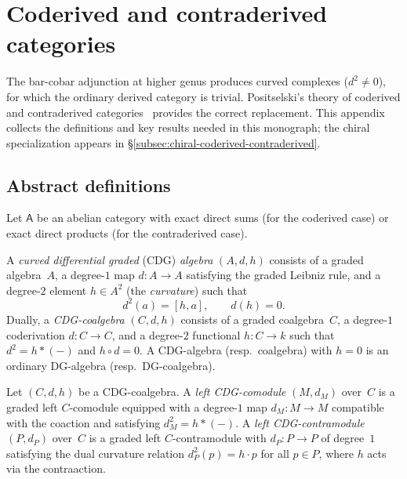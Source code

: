 

\section{Coderived and contraderived categories}
\label{app:coderived}

The bar-cobar adjunction at higher genus produces curved complexes
($d^2 \neq 0$), for which the ordinary derived category is trivial.
Positselski's theory of coderived and contraderived
categories~\cite{Positselski11} provides the correct
replacement.  This appendix collects the definitions and key results
needed in this monograph; the chiral specialization appears in
\S\ref{subsec:chiral-coderived-contraderived}.

\subsection{Abstract definitions}
\label{subsec:coderived-abstract}

Let $\mathsf{A}$ be an abelian category with exact direct sums
(for the coderived case) or exact direct products
(for the contraderived case).

\begin{definition}
\label{def:cdg-algebra-appendix}
A \emph{curved differential graded} (CDG) \emph{algebra}
$(A, d, h)$ consists of a graded algebra~$A$, a degree-$1$
map $d \colon A \to A$ satisfying the graded Leibniz rule, and
a degree-$2$ element $h \in A^2$ (the \emph{curvature}) such that
\begin{equation}\label{eq:cdg-relations-appendix}
d^2(a) = [h, a], \qquad d(h) = 0.
\end{equation}
Dually, a \emph{CDG-coalgebra} $(C, d, h)$ consists of a graded
coalgebra~$C$, a degree-$1$ coderivation $d \colon C \to C$,
and a degree-$2$ functional $h \colon C \to k$ such that
$d^2 = h \ast (-)$ and $h \circ d = 0$.
A CDG-algebra (resp.\ coalgebra) with $h = 0$ is an ordinary
DG-algebra (resp.\ DG-coalgebra).
\end{definition}

\begin{definition}
\label{def:cdg-comod-contra-appendix}
Let $(C, d, h)$ be a CDG-coalgebra.
A \emph{left CDG-comodule} $(M, d_M)$ over~$C$ is a graded left
$C$-comodule equipped with a degree-$1$ map $d_M \colon M \to M$
compatible with the coaction and satisfying $d_M^2 = h \ast (-)$.
A \emph{left CDG-contramodule} $(P, d_P)$ over~$C$ is a graded left
$C$-contramodule with $d_P \colon P \to P$ of degree~$1$ satisfying
the dual curvature relation $d_P^2(p) = h \cdot p$
for all $p \in P$, where $h$ acts via the contraaction.
\end{definition}


